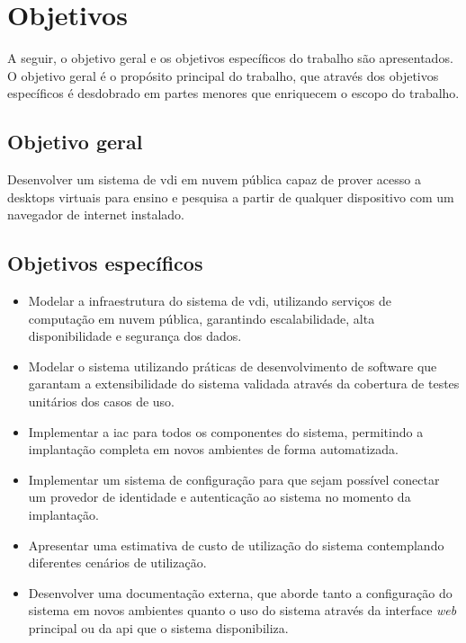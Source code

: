 
\section{Objetivos}
\label{sec:objetivos}

A seguir, o objetivo geral e os objetivos específicos do trabalho são apresentados. O objetivo geral
é o propósito principal do trabalho, que através dos objetivos específicos é desdobrado em partes
menores que enriquecem o escopo do trabalho.

\subsection{Objetivo geral}
\label{subsec:objetivoGeral}

Desenvolver um sistema de \gls{vdi} em nuvem pública capaz de prover acesso a \glspl{desktop}
virtuais para ensino e pesquisa a partir de qualquer dispositivo com um navegador de internet
instalado.

\subsection{Objetivos específicos}
\label{subsec:objetivosEspecificos}

\begin{itemize}
    \item Modelar a infraestrutura do sistema de \gls{vdi}, utilizando serviços de computação em nuvem pública, garantindo escalabilidade, alta disponibilidade e segurança dos dados.

    \item Modelar o sistema utilizando práticas de desenvolvimento de software que garantam a extensibilidade do sistema validada através da cobertura de testes unitários dos casos de uso.

    \item Implementar a \gls{iac} para todos os componentes do sistema, permitindo a implantação completa em novos ambientes de forma automatizada.

    \item Implementar um sistema de configuração para que sejam possível conectar um provedor de identidade e autenticação ao sistema no momento da implantação.

    \item Apresentar uma estimativa de custo de utilização do sistema contemplando diferentes cenários de utilização.

    \item Desenvolver uma documentação externa, que aborde tanto a configuração do sistema em novos ambientes quanto o uso do sistema através da interface \textit{web} principal ou da \gls{api} que o sistema disponibiliza.
\end{itemize}

